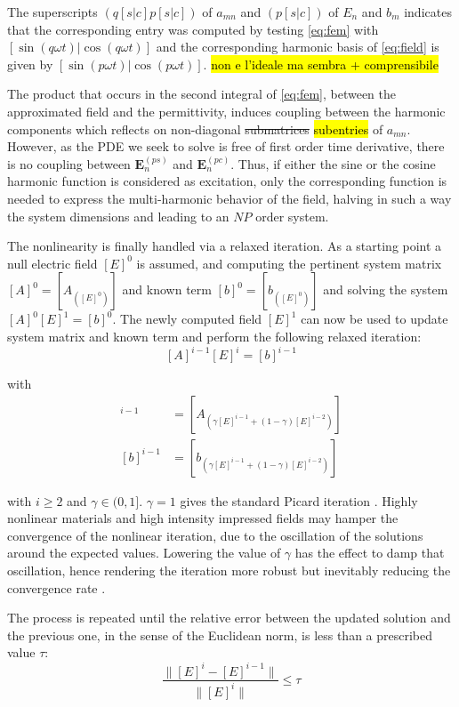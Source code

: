 \documentclass[journal]{IEEEtran}
\renewcommand{\vec}[1]{\mathbf{#1}}
\begin{document}
\noindent The superscripts $(q[s|c]p[s|c])$ of $a_{mn}$ and
$(p[s|c])$ of $E_n$ and $b_m$ indicates that the corresponding
entry was computed by testing \eqref{eq:fem} with $[\sin(q \omega t) | \cos(q \omega t)]$ 
and the corresponding harmonic basis of \eqref{eq:field}
is given by $[\sin(p \omega t) | \cos(p \omega t)]$. 
\hl{non e l'ideale ma sembra + comprensibile}

The product that occurs in the second integral of \eqref{eq:fem}, between the
approximated field and the permittivity, induces coupling between the harmonic
components which reflects on non-diagonal \st{submatrices} \hl{subentries} of $a_{mn}$. 
However, as the PDE we seek to solve is free of first order time derivative, there is no 
coupling between $\vec{E}_{n}^{(ps)}$ and $\vec{E}_{n}^{(pc)}$. Thus, if either the 
sine or the cosine harmonic function is considered as excitation, only the corresponding
function is needed to express the multi-harmonic behavior of the 
field, halving in such a way the system dimensions and leading to an $NP$ order
system.

The nonlinearity is finally handled via a
relaxed iteration. As a starting point a null electric field $[E]^0$ is assumed,
and computing the pertinent system matrix $[A]^0=[A_{([E]^0)}]$ and
known term $[b]^0=[b_{([E]^0)}]$ and solving the system $[A]^0 [E]^1 =
[b]^0$. The newly computed field $[E]^1$ can now be used to update system
matrix and known term and perform the following relaxed iteration:
%
\begin{equation} \label{eq:lastLinearSystem}
[A]^{i-1} [E]^{i} = [b]^{i-1}
\end{equation}

\noindent with 
%
\begin{align}
[A]^{i-1} &= [A_{(\gamma [E]^{i-1} + (1-\gamma) [E]^{i-2})}] \\
[b]^{i-1} &= [b_{(\gamma [E]^{i-1} + (1-\gamma) [E]^{i-2})}]
\end{align}

\noindent with $i \geq 2$ and
$\gamma\in(0,1]$. $\gamma=1$ gives the standard Picard iteration \cite{Guarnieri2010}. 
Highly nonlinear materials and high intensity impressed fields may hamper the convergence
 of the nonlinear iteration, due to
the oscillation of the solutions around the expected values. Lowering the value
of $\gamma$ has the effect to damp that oscillation, hence rendering the
iteration more robust but inevitably reducing the convergence rate \cite{Silvester1997}.

The process is repeated until the relative error between the updated solution
and the previous one, in the sense of the Euclidean norm, is less than a
prescribed value $\tau$:
%
\begin{equation}
\frac{\|[E]^{i} - [E]^{i-1} \|}{\| [E]^{i} \|} \leq \tau
\end{equation}
\end{document}
